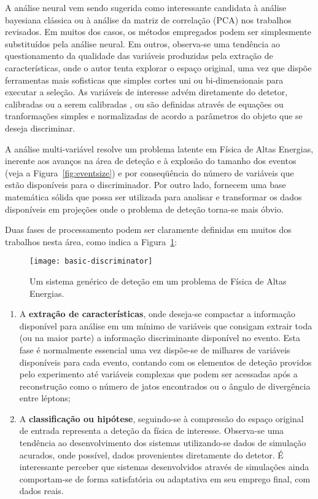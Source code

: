 A análise neural vem sendo sugerida como interessante candidata à análise
bayesiana clássica ou à análise da matriz de correlação (PCA) nos trabalhos
revisados. Em muitos dos casos, os métodos empregados podem ser simplesmente
substituídos pela análise neural. Em outros, observa-se uma tendência ao
questionamento da qualidade das variáveis produzidas pela extração de
características, onde o autor tenta explorar o espaço original, uma vez que
dispõe ferramentas mais sofisticas que simples cortes uni ou bi-dimensionais
para executar a seleção. As variáveis de interesse advém diretamente do
detetor, calibradas ou a serem calibradas \cite{silva-acat-2001}, ou são
definidas através de equações ou tranformações simples e normalizadas de
acordo a parâmetros do objeto que se deseja discriminar.

A análise multi-variável resolve um problema latente em Física de Altas
Energias, inerente aos avanços na área de deteção e à explosão do tamanho dos
eventos (veja a Figura~\ref{fig:eventsize}) e por conseqüência do número de
variáveis que estão disponíveis para o discriminador. Por outro lado, fornecem
uma base matemática sólida que possa ser utilizada para analisar e transformar
os dados disponíveis em projeções onde o problema de deteção torna-se mais
óbvio.

Duas fases de processamento podem ser claramente definidas em muitos dos
trabalhos nesta área, como indica a Figura~\ref{fig:basic-discriminator}:

\begin{figure}
\begin{center}
\texttt{[image: basic-discriminator]}
\end{center}
\caption{Um sistema genérico de deteção em um problema de Física de Altas Energias.}
\label{fig:basic-discriminator}
\end{figure}

\begin{enumerate}
\item A \textbf{extração de características}, onde deseja-se compactar a
informação disponível para análise em um mínimo de variáveis que consigam
extrair toda (ou na maior parte) a informação discriminante disponível no
evento. Esta fase é normalmente essencial uma vez dispõe-se de milhares de
variáveis disponíveis para cada evento, contando com os elementos de deteção
providos pelo experimento até variáveis complexas que podem ser acessadas após
a reconstrução como o número de jatos encontrados ou o ângulo de divergência
entre léptons;
\item A \textbf{classificação ou hipótese}, seguindo-se à compressão do espaço
original de entrada representa a deteção da física de interesse. Observa-se uma
tendência ao desenvolvimento dos sistemas utilizando-se dados de simulação
acurados, onde possível, dados provenientes diretamente do detetor. É
interessante perceber que sistemas desenvolvidos através de simulações ainda
comportam-se de forma satisfatória ou adaptativa em seu emprego final, com
dados reais.
\end{enumerate}

